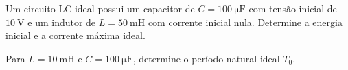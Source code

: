 \begin{questao}[2]{}
Um circuito LC ideal possui um capacitor de $C=\SI{100}{\micro\farad}$
com tensão inicial de $\SI{10}{\volt}$ e um indutor de
$L=\SI{50}{\milli\henry}$ com corrente inicial nula.
Determine a energia inicial e a corrente máxima ideal.
\end{questao}

\begin{questao}[2]{}
Para $L=\SI{10}{\milli\henry}$ e $C=\SI{100}{\micro\farad}$, determine o
período natural ideal $T_0$.
\end{questao}

\gabarito[Nível 2]
